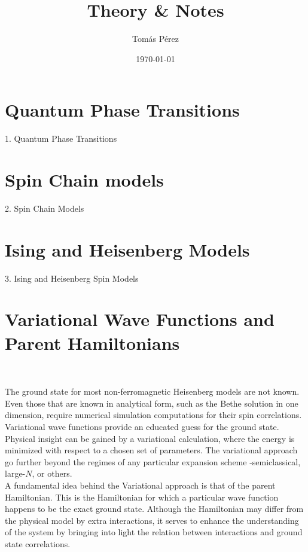 \documentclass{homework}
\author{Tomás Pérez}
\date{\today}
\title{Theory \& Notes}
\begin{document}
 \maketitle

\tableofcontents

\section{\textbf{Quantum Phase Transitions}}
{1. Quantum Phase Transitions}
\clearpage

\section{\textbf{Spin Chain models}}
{2. Spin Chain Models}
\clearpage

\section{\textbf{Ising and Heisenberg Models}}
{3. Ising and Heisenberg Spin Models}
\clearpage

\section{\textbf{Variational Wave Functions and Parent Hamiltonians}}

\blanky \\

\begin{tcolorbox}[colback =yellow, title = Physical Context]

The ground state for most non-ferromagnetic Heisenberg models are not known. Even those that are known in analytical form, such as the Bethe solution in one dimension, require numerical simulation computations for their spin correlations. Variational wave functions provide an educated guess for the ground state. Physical insight can be gained by a variational calculation, where the energy is minimized with respect to a chosen set of parameters. The variational approach go further beyond the regimes of any particular expansion scheme -semiclassical, large-$N$, or others. \\

A fundamental idea behind the Variational approach is that of the parent Hamiltonian. This is the Hamiltonian for which a particular wave function happens to be the exact ground state. Although the Hamiltonian may differ from the physical model by extra interactions, it serves to enhance the understanding of the system by bringing into light the relation between interactions and ground state correlations. \\

\end{tcolorbox}
\end{document}
